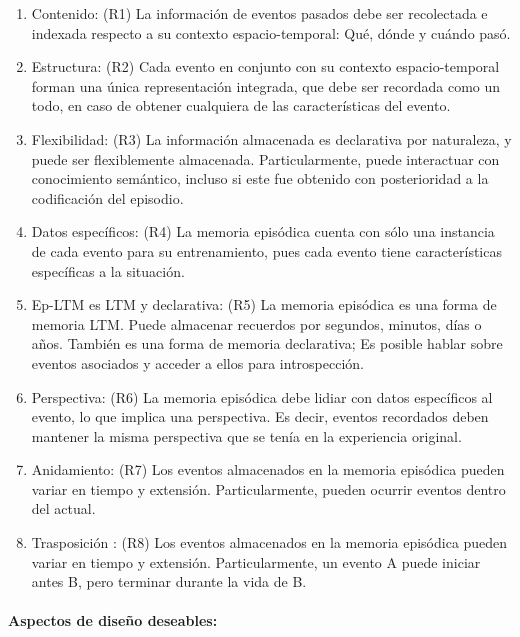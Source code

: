 \begin{enumerate}[topsep=0pt]
	\setlength\itemsep{0.2em}
	\item Contenido: (R1) La información de eventos pasados debe ser recolectada e indexada respecto a su contexto espacio-temporal: Qué, dónde y cuándo pasó.
	
	\item Estructura: (R2) Cada evento en conjunto con su contexto espacio-temporal forman una única representación integrada, que debe ser recordada como un todo, en caso de obtener cualquiera de las características del evento.
	
	\item Flexibilidad: (R3) La información almacenada es declarativa por naturaleza, y puede ser flexiblemente almacenada. Particularmente, puede interactuar con conocimiento semántico, incluso si este fue obtenido con posterioridad a la codificación del episodio.
	
	\item Datos específicos: (R4) La memoria episódica cuenta con sólo una instancia de cada evento para su entrenamiento, pues cada evento tiene características específicas a la situación.
	
	\item Ep-LTM es LTM y declarativa: (R5) La memoria episódica es una forma de memoria LTM. Puede almacenar recuerdos por segundos, minutos, días o años. También es una forma de memoria declarativa; Es posible hablar sobre eventos asociados y acceder a ellos para introspección.
	
	\item Perspectiva: (R6) La memoria episódica debe lidiar con datos específicos al evento, lo que implica una perspectiva. Es decir, eventos recordados deben mantener la misma perspectiva que se tenía en la experiencia original.
	
	\item Anidamiento: (R7) Los eventos almacenados en la memoria episódica pueden variar en tiempo y extensión. Particularmente, pueden ocurrir eventos dentro del actual.
	
	\item Trasposición : (R8) Los eventos almacenados en la memoria episódica pueden variar en tiempo y extensión. Particularmente, un evento A puede iniciar antes B, pero terminar durante la vida de B.
	
\end{enumerate}

\paragraph{Aspectos de diseño deseables:}

